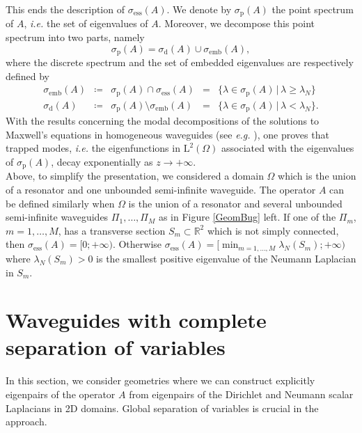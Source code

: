 \documentclass[11pt,a4paper]{article}
\newcommand{\Om}{\Omega}
\newcommand{\mrm}[1]{\mathrm{#1}}
\newcommand{\R}{\mathbb{R}}
\newcommand{\mL}{\mrm{L}}
\begin{document}
\newline
This ends the description of $\sigma_{\mrm{ess}}(A)$. We denote by $\sigma_{\mrm{p}}(A)$ the point spectrum of $A$, \textit{i.e.} the set of eigenvalues of $A$. Moreover, we decompose this point spectrum 
into two parts, namely
\[
\sigma_{\mrm{p}}(A)=\sigma_{\mrm{d}}(A)\cup\sigma_{\mrm{emb}}(A),
\]
where the discrete spectrum and the set of embedded eigenvalues are respectively defined by
\[
\begin{array}{|rclcl}
\sigma_{\mrm{emb}}(A) & \coloneqq &  \sigma_{\mrm{p}}(A)\cap \sigma_{\mrm{ess}}(A) & =& \{\lambda\in\sigma_{\mrm{p}}(A)\,|\,\lambda\ge\lambda_N\} \\[3pt]
\sigma_{\mrm{d}}(A) & \coloneqq & \sigma_{\mrm{p}}(A)\setminus \sigma_{\mrm{emb}}(A)& = & \{\lambda\in\sigma_{\mrm{p}}(A)\,|\,\lambda<\lambda_N\} .
\end{array}
\] 
With the results concerning the modal decompositions of the solutions to Maxwell's equations in homogeneous waveguides (see \textit{e.g.} \cite{Cess96,PlPo2014,Kim17,PlPo18,PlPoSa18}), one proves that trapped modes, \textit{i.e.} the eigenfunctions in $\boldsymbol{\mL}^2(\Om)$ associated with the eigenvalues of $\sigma_{\mrm{p}}(A)$, decay exponentially as $z\to+\infty$.\\ 
\newline
Above, to simplify the presentation, we considered a domain $\Om$ which is the union of a resonator and one unbounded semi-infinite waveguide. The operator $A$ can be defined similarly when $\Om$ is the union of a resonator and several unbounded semi-infinite waveguides $\Pi_1,\dots,\Pi_M$ as in Figure \ref{GeomBug} left. If one of the $\Pi_m$, $m=1,\dots,M$, has a transverse section $S_m\subset\R^2$ which is not simply connected, then $\sigma_{\mrm{ess}}(A)=[0;+\infty)$. Otherwise $\sigma_{\mrm{ess}}(A)=[\min_{m=1,\dots,M}\lambda_N(S_m);+\infty)$ where $\lambda_N(S_m)>0$ is the smallest positive eigenvalue of the Neumann Laplacian in $S_m$.




\section{Waveguides with complete separation of variables}\label{SectionFullySeparable}
In this section, we consider geometries where we can construct explicitly eigenpairs of the operator $A$ from eigenpairs of the Dirichlet and Neumann scalar Laplacians in 2D domains. Global separation of variables is crucial in the approach. 
\end{document}
